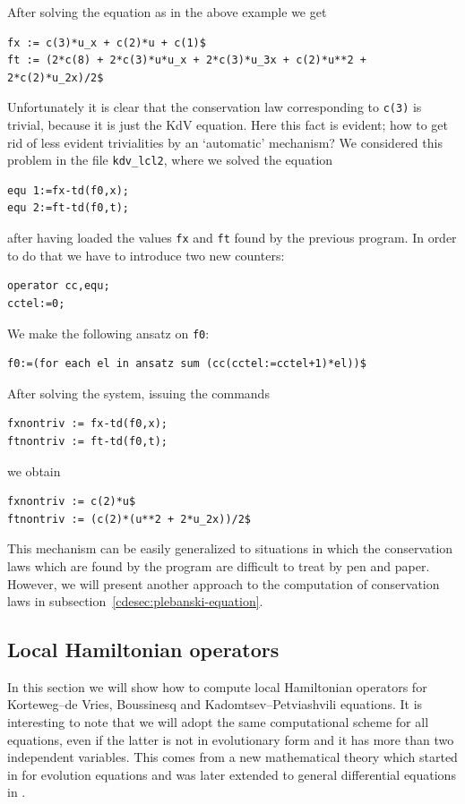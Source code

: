 After solving the equation as in the above example we get
\begin{verbatim}
fx := c(3)*u_x + c(2)*u + c(1)$
ft := (2*c(8) + 2*c(3)*u*u_x + 2*c(3)*u_3x + c(2)*u**2 +
2*c(2)*u_2x)/2$
\end{verbatim}
Unfortunately it is clear that the conservation law corresponding to
\texttt{c(3)} is trivial, because it is just the KdV equation. Here this fact
is evident; how to get rid of less evident trivialities by an `automatic'
mechanism? We considered this problem in the file \texttt{kdv\_lcl2},
where we solved the equation
\begin{verbatim}
equ 1:=fx-td(f0,x);
equ 2:=ft-td(f0,t);
\end{verbatim}
after having loaded the values \texttt{fx} and \texttt{ft} found by the
previous program. In order to do that we have to introduce two new counters:
\begin{verbatim}
operator cc,equ;
cctel:=0;
\end{verbatim}
We make the following ansatz on \texttt{f0}:
\begin{verbatim}
f0:=(for each el in ansatz sum (cc(cctel:=cctel+1)*el))$
\end{verbatim}
After solving the system, issuing the commands
\begin{verbatim}
fxnontriv := fx-td(f0,x);
ftnontriv := ft-td(f0,t);
\end{verbatim}
we obtain
\begin{verbatim}
fxnontriv := c(2)*u$
ftnontriv := (c(2)*(u**2 + 2*u_2x))/2$
\end{verbatim}
This mechanism can be easily generalized to situations in which the
conservation laws which are found by the program are difficult to treat by pen
and paper. However, we will present another approach to the computation of
conservation laws in subsection~\ref{cdesec:plebanski-equation}.

\subsection{Local Hamiltonian operators}
\label{cdesec:local-hamilt-oper}

In this section we will show how to compute local Hamiltonian operators for
Korteweg--de Vries, Boussinesq and Kadomtsev--Petviashvili equations. It is
interesting to note that we will adopt the same computational scheme for all
equations, even if the latter is not in evolutionary form and it has more than
two independent variables. This comes from a new mathematical theory which
started in \cite{KerstenKrasilshchikVerboretsky:2004} for evolution equations and was later extended to general
differential equations in \cite{KerstenKrasilshchikVerbovetskyVitolo:HSGP}.

